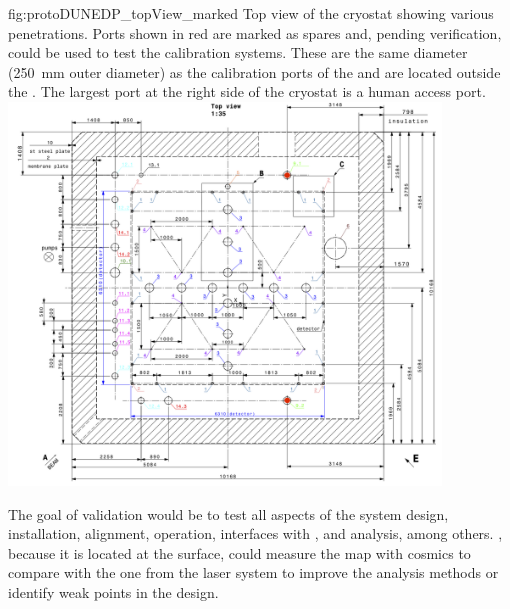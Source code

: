 \begin{dunefigure}{fig:protoDUNEDP_topView_marked}
{Top view of the  cryostat showing various penetrations. Ports shown in red are marked as spares and, pending verification, could be used to test the calibration systems. These are the same diameter (\SI{250}{\milli\m} outer diameter) as the calibration ports of the   and are located outside the . The largest port at the right side of the cryostat is a human access port.}
\includegraphics[height=4.0in]{graphics/protoDUNEDP_topView_marked.png}
\end{dunefigure}

The goal of validation would be to test all aspects of the system design, installation, alignment, operation, interfaces with , and analysis, among others. , because it is located at the surface, could measure the \efield map with cosmics to compare with the one from the laser system to improve the analysis methods or identify weak points in the design. 

